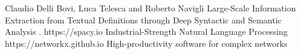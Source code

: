 \documentclass[conference,compsoc]{IEEEtran}
\begin{document}
\begin{thebibliography}{1}
Claudio Delli Bovi, Luca Telesca and Roberto Navigli {Large-Scale Information Extraction from Textual Definitions through Deep Syntactic and Semantic Analysis} .
https://spacy.io {Industrial-Strength Natural Language Processing} 
https://networkx.github.io {High-productivity software for complex networks}
\end{thebibliography}




\end{document}
